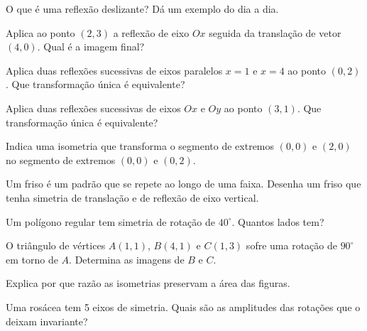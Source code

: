 \documentclass[12pt]{article}
\begin{document}
\begin{exercicios}
  \item O que é uma reflexão deslizante? Dá um exemplo do dia a dia.
  \item Aplica ao ponto $(2, 3)$ a reflexão de eixo $Ox$ seguida da translação de vetor $(4, 0)$. Qual é a imagem final?
  \item Aplica duas reflexões sucessivas de eixos paralelos $x = 1$ e $x = 4$ ao ponto $(0, 2)$. Que transformação única é equivalente?
  \item Aplica duas reflexões sucessivas de eixos $Ox$ e $Oy$ ao ponto $(3, 1)$. Que transformação única é equivalente?
  \item Indica uma isometria que transforma o segmento de extremos $(0,0)$ e $(2,0)$ no segmento de extremos $(0,0)$ e $(0,2)$.
\end{exercicios}

\begin{exercicios}
  \item Um friso é um padrão que se repete ao longo de uma faixa. Desenha um friso que tenha simetria de translação e de reflexão de eixo vertical.
  \item Um polígono regular tem simetria de rotação de $40^\circ$. Quantos lados tem?
  \item O triângulo de vértices $A(1, 1)$, $B(4, 1)$ e $C(1, 3)$ sofre uma rotação de $90^\circ$ em torno de $A$. Determina as imagens de $B$ e $C$.
  \item Explica por que razão as isometrias preservam a área das figuras.
  \item Uma rosácea tem 5 eixos de simetria. Quais são as amplitudes das rotações que o deixam invariante?
\end{exercicios}
\end{document}
